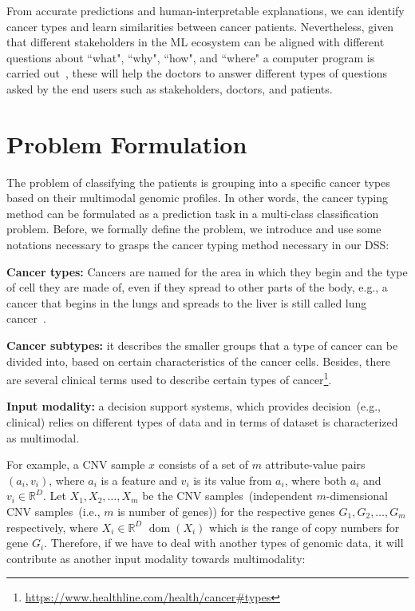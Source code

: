 \hspace*{3.5mm} From accurate predictions and human-interpretable explanations, we can identify cancer types and learn similarities between cancer patients. Nevertheless, given that different stakeholders in the ML ecosystem can be aligned with different questions about ``what", ``why", ``how", and ``where" a computer program is carried out~\cite{zednik2019solving}, these will help the doctors to answer different types of questions asked by the end users such as stakeholders, doctors, and patients.  

\section{Problem Formulation} \label{problem_challenges}
The problem of classifying the patients is grouping into a specific cancer types based on their multimodal genomic profiles. In other words, the cancer typing method can be formulated as a prediction task in a multi-class classification problem. Before, we formally define the problem, we introduce and use some notations necessary to grasps the cancer typing method necessary in our DSS: 

\begin{definition}
    \textbf{Cancer types:} Cancers are named for the area in which they begin and the type of cell they are made of, even if they spread to other parts of the body, e.g., a cancer that begins in the lungs and spreads to the liver is still called lung cancer~\cite{19Cruz}. 
\end{definition}

\begin{definition}
    \textbf{Cancer subtypes:} it describes the smaller groups that a type of cancer can be divided into, based on certain characteristics of the cancer cells. Besides, there are several clinical terms used to describe certain types of cancer\footnote{\url{https://www.healthline.com/health/cancer\#types}}. 
\end{definition}

\begin{definition}
    \textbf{Input modality:} a decision support systems, which provides decision~(e.g., clinical) relies on different types of data and in terms of dataset is characterized as multimodal. 
\end{definition}  
 
\hspace*{3.5mm} For example, a CNV sample $x$ consists of a set of $m$ attribute-value pairs $\left(a_{i}, v_{i}\right)$, where $a_i$ is a feature and $v_i$ is its value from $a_{i}$, where both $a_{i}$ and $v_i \in \mathbb{R}^{D}$. Let $X_{1}, X_{2}, \ldots, X_{m}$ be the CNV samples~(independent $m$-dimensional CNV samples~(i.e., $m$ is number of genes)) for the respective genes $G_{1}, G_{2}, \ldots, G_{m}$ respectively, where $X_{i} \in \mathbb{R}^{D}$ $\operatorname{dom}\left(X_{i}\right)$ which is the range of copy numbers for gene $G_{i}$. Therefore, if we have to deal with another types of genomic data, it will contribute as another input modality towards multimodality:  

